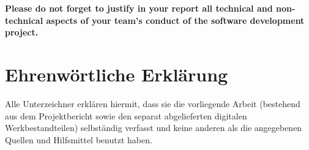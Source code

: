 \documentclass[a4paper,11pt,twoside]{article}
\begin{document}
\textbf{Please do not forget to justify in your report all technical and non-technical aspects of your team's conduct of the software development project.}

	\cleardoublepage
	\pagestyle{report}
	\fancyhead[RE,LO]{}

	\tableofcontents

	\cleardoublepage

	\listoffigures
	\listoftables


\cleardoublepage


\cleardoublepage


\cleardoublepage


\cleardoublepage


\cleardoublepage


\cleardoublepage


\cleardoublepage



\cleardoublepage
\fancyhead[RE,LO]{}


\cleardoublepage


\cleardoublepage
{}
{}

\section*{Ehrenwörtliche Erklärung}
\label{sec:erklaerung}
Alle Unterzeichner erklären hiermit, dass sie die vorliegende Arbeit
(bestehend aus dem Projektbericht sowie den separat abgelieferten
digitalen Werkbestandteilen) selbständig verfasst und keine anderen als
die angegebenen Quellen und Hilfsmittel benutzt haben.





	\newpage


\end{document}

